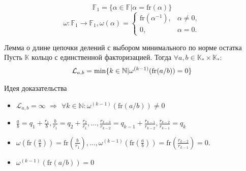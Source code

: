\documentclass[8pt, xcolor=x11names]{beamer}
\begin{document}
\begin{frame}
    \begin{block}{\vspace*{-3ex}}
        $$
            \mathbb{F}_{1}=\{\alpha\in\mathbb{F}|\alpha=\textrm{fr}(\alpha)\}
        $$
        $$
            \omega:\mathbb{F}_{1}\to\mathbb{F}_{1}, \omega(\alpha)=
            \begin{cases}
                \textrm{fr}(\alpha^{-1}), & \alpha\neq0,\\
                0, & \alpha = 0.
            \end{cases}
        $$
    \end{block}
    
    \begin{block}{Лемма о длине цепочки делений с выбором минимального по норме остатка}
        Пусть $\mathbb{K}$ кольцо с единственной факторизацией.
        Тогда $\forall a, b \in \mathbb{K}_{*}\times\mathbb{K}_{*}$:
        \begin{eqnarray*}
            \mathcal{L}_{a,b}=\textnormal{min}\{k\in\mathbb{N}|\omega^{(k-1)}(\textrm{fr}(a/b))=0\}
        \end{eqnarray*}
    \end{block}
    
    \begin{block}{Идея доказательства}
        \begin{itemize}
            \item $\mathcal{L}_{a,b} = \infty$ $\Rightarrow$ $\forall k \in \mathbb{N}: \omega^{(k-1)}(\textrm{fr}(a/b)) \neq 0$
            
            \item $\frac{a}{b}=q_{1}+\frac{r_{1}}{b}, \frac{b}{r_{1}}=q_{2}+\frac{r_{2}}{r_{1}}, \ldots, \frac{r_{k-3}}{r_{k-2}}=q_{k-1}+\frac{r_{k-1}}{r_{k-2}}, \frac{r_{k-2}}{r_{k-1}}=q_{k}$
            
            \item
            $
                \omega\left(\textrm{fr}\left(\frac{a}{b}\right)\right)=\textrm{fr}\left(\frac{b}{r_{1}}\right),
                \ldots,
                \omega^{(k-1)}\left(\textrm{fr}\left(\frac{a}{b}\right)\right)=\textrm{fr}\left(\frac{r_{k-2}}{r_{k-1}}\right)=0.
            $
            
            \item $\omega^{(k-1)}(\textrm{fr}(a/b))=0$
        \end{itemize}
    \end{block}
\end{frame}
\end{document}

